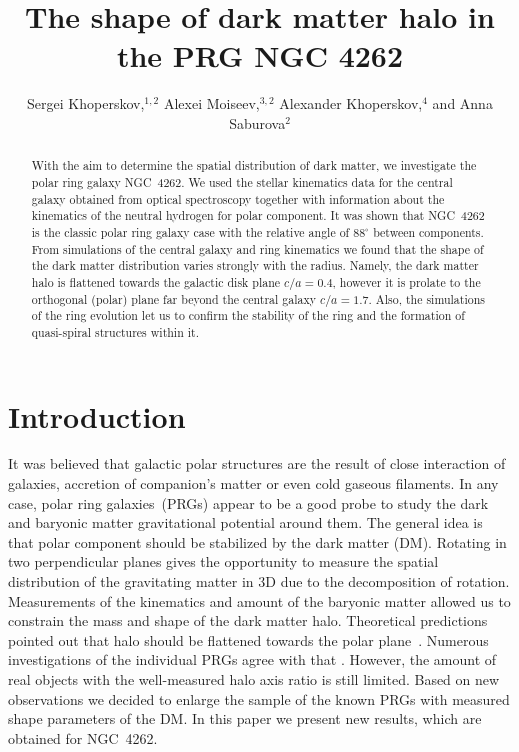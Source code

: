 \documentclass[11pt,twoside]{article}
\begin{document}
\title{The shape of dark matter halo in the PRG NGC 4262}
\author{Sergei Khoperskov,$^{1,2}$ Alexei Moiseev,$^{3,2}$ Alexander Khoperskov,$^4$ and Anna Saburova$^2$
}

\begin{abstract}
With the aim to determine the spatial distribution of dark matter, we investigate the polar ring galaxy NGC~4262. We used the stellar kinematics data for the central galaxy obtained from optical spectroscopy together with information about the kinematics of the neutral hydrogen for polar component. It was shown that NGC~4262 is the classic polar ring galaxy case with the relative angle of $88^{\circ}$ between components. From simulations of the central galaxy and ring kinematics we found that the shape of the dark matter distribution varies strongly with the radius. Namely, the dark matter halo is flattened towards the galactic disk plane $c/a=0.4$, however it is prolate to the orthogonal (polar) plane far beyond the central galaxy $c/a=1.7$. Also, the simulations of the ring evolution let us to confirm the stability of the ring and the formation of quasi-spiral structures within it.
\end{abstract}

\section{Introduction}
It was believed that galactic polar structures are the result of close interaction of galaxies, accretion of companion's matter or even cold gaseous filaments. In any case, polar ring galaxies~(PRGs)  appear to be a  good probe to study the dark and baryonic matter gravitational potential around them. The general idea is that polar component should  be stabilized by the dark matter (DM). Rotating in two perpendicular planes gives the opportunity to measure the spatial distribution of the gravitating matter in 3D due to  the decomposition of rotation. Measurements of the kinematics and amount of the baryonic matter  allowed us to constrain the mass and shape of  the dark matter  halo. Theoretical predictions pointed out that halo should be flattened towards the polar plane~\citep{1986MNRAS.219..657S,1982ApJ...263L..51S}. Numerous investigations of the individual  PRGs agree with that \citep[e.g.][]{1993A&A...267...21A,1996A&A...305..763C,2003ApJ...585..730I}. However, the amount of real objects with the well-measured halo axis ratio is still limited. Based on new observations we decided to enlarge the sample of the known PRGs with measured shape parameters of the DM. In this paper we present   new results, which are obtained for NGC~4262.
\end{document}
